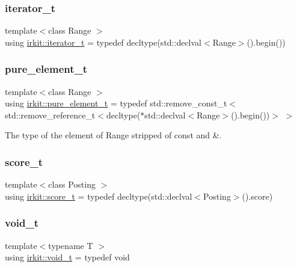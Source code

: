 \subsubsection{\texorpdfstring{iterator\+\_\+t}{iterator\_t}}
{\footnotesize\ttfamily template$<$class Range $>$ \\
using \hyperlink{namespaceirkit_af390a50be8f636e7239c650e5043c56f}{irkit\+::iterator\+\_\+t} = typedef decltype(std\+::declval$<$Range$>$().begin())}

\mbox{\label{namespaceirkit_afcffab67300c5c703cb38a363c9a6f1d}} 
\subsubsection{\texorpdfstring{pure\+\_\+element\+\_\+t}{pure\_element\_t}}
{\footnotesize\ttfamily template$<$class Range $>$ \\
using \hyperlink{namespaceirkit_afcffab67300c5c703cb38a363c9a6f1d}{irkit\+::pure\+\_\+element\+\_\+t} = typedef std\+::remove\+\_\+const\+\_\+t$<$ std\+::remove\+\_\+reference\+\_\+t$<$decltype($\ast$std\+::declval$<$Range$>$().begin())$>$ $>$}



The type of the element of Range stripped of {\ttfamily const} and {\ttfamily \&}. 

\mbox{\label{namespaceirkit_a754dabe3346f950c948e7596d9d46c71}} 
\subsubsection{\texorpdfstring{score\+\_\+t}{score\_t}}
{\footnotesize\ttfamily template$<$class Posting $>$ \\
using \hyperlink{namespaceirkit_a754dabe3346f950c948e7596d9d46c71}{irkit\+::score\+\_\+t} = typedef decltype(std\+::declval$<$Posting$>$().score)}

\mbox{\label{namespaceirkit_ad3b30e41bd53e61f81bbd892123abe1a}} 
\subsubsection{\texorpdfstring{void\+\_\+t}{void\_t}}
{\footnotesize\ttfamily template$<$typename T $>$ \\
using \hyperlink{namespaceirkit_ad3b30e41bd53e61f81bbd892123abe1a}{irkit\+::void\+\_\+t} = typedef void}



